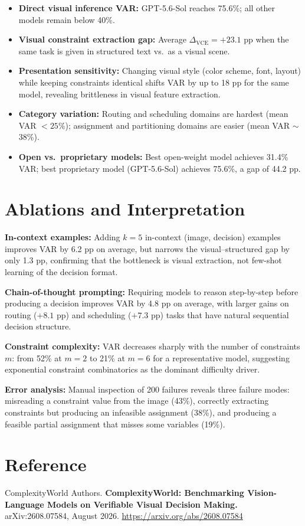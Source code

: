 \documentclass[10pt,twocolumn]{article}
\begin{document}
\begin{itemize}[itemsep=2pt,parsep=0pt]
  \item \textbf{Direct visual inference VAR:} GPT-5.6-Sol
    reaches 75.6\%; all other models remain below 40\%.
  \item \textbf{Visual constraint extraction gap:} Average
    $\Delta_\text{VCE} = +23.1$ pp when the same task is
    given in structured text vs.\ as a visual scene.
  \item \textbf{Presentation sensitivity:} Changing visual style
    (color scheme, font, layout) while keeping constraints identical
    shifts VAR by up to 18 pp for the same model, revealing
    brittleness in visual feature extraction.
  \item \textbf{Category variation:} Routing and scheduling domains
    are hardest (mean VAR $<25\%$); assignment and partitioning
    domains are easier (mean VAR $\sim$38\%).
  \item \textbf{Open vs.\ proprietary models:} Best open-weight
    model achieves 31.4\% VAR; best proprietary model (GPT-5.6-Sol)
    achieves 75.6\%, a gap of 44.2 pp.
\end{itemize}

\section{Ablations and Interpretation}

\textbf{In-context examples:} Adding $k=5$ in-context (image, decision)
examples improves VAR by 6.2 pp on average, but narrows the
visual--structured gap by only 1.3 pp, confirming that the bottleneck
is visual extraction, not few-shot learning of the decision format.

\textbf{Chain-of-thought prompting:} Requiring models to reason
step-by-step before producing a decision improves VAR by 4.8 pp
on average, with larger gains on routing ($+8.1$ pp) and scheduling
($+7.3$ pp) tasks that have natural sequential decision structure.

\textbf{Constraint complexity:} VAR decreases sharply with the
number of constraints $m$: from 52\% at $m=2$ to 21\% at $m=6$
for a representative model, suggesting exponential constraint
combinatorics as the dominant difficulty driver.

\textbf{Error analysis:} Manual inspection of 200 failures reveals
three failure modes: misreading a constraint value from the image
(43\%), correctly extracting constraints but producing an infeasible
assignment (38\%), and producing a feasible partial assignment that
misses some variables (19\%).

\section*{Reference}

ComplexityWorld Authors.
\textbf{ComplexityWorld: Benchmarking Vision-Language Models
on Verifiable Visual Decision Making.}
arXiv:2608.07584, August 2026.
\url{https://arxiv.org/abs/2608.07584}
\end{document}
